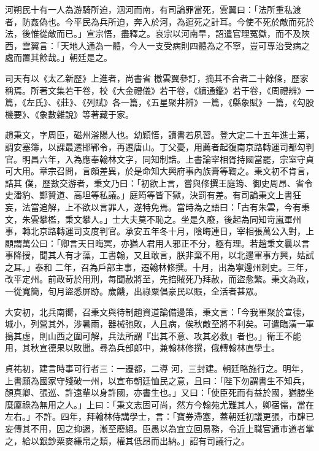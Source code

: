 \begin{pinyinscope}
 河朔民十有一人為游騎所迫，泅河而南，有司論罪當死，雲翼曰：「法所重私渡者，防姦偽也。今平民為兵所迫，奔入於河，為逭死之計耳。今使不死於敵而死於法，後惟從敵而已。」宣宗悟，盡釋之。哀宗以河南旱，詔遣官理冤獄，而不及陜西，雲翼言：「天地人通為一體，今人一支受病則四體為之不寧，豈可專治受病之處而置其餘哉。」朝廷是之。



 司天有以《太乙新歷》上進者，尚書省
 檄雲翼參訂，摘其不合者二十餘條，歷家稱焉。所著文集若干卷，校《大金禮儀》若干卷，《續通鑑》若干卷，《周禮辨》一篇，《左氏》、《莊》、《列賦》各一篇，《五星聚井辨》一篇，《縣象賦》一篇，《勾股機要》、《象數雜說》等著藏于家。



 趙秉文，字周臣，磁州滏陽人也。幼穎悟，讀書若夙習。登大定二十五年進士第，調安塞簿，以課最遷邯鄲令，再遷唐山。丁父憂，用薦者起復南京路轉運司都勾判官。明昌六年，入為應奉翰林文字，同知制誥。上書論宰相胥持國當罷，宗室守貞可大用。章宗召問，言頗差異，於是命知大興府事內族膏等鞫之。秉文初不肯言，詰其
 僕，歷數交游者，秉文乃曰：「初欲上言，嘗與修撰王庭筠、御史周昂、省令史潘豹、鄭贊道、高坦等私議。」庭筠等皆下獄，決罰有差。有司論秉文上書狂妄，法當追解，上不欲以言罪人，遂特免焉。當時為之語曰：「古有朱雲，今有秉文，朱雲攀檻，秉文攀人。」士大夫莫不恥之。坐是久廢，後起為同知岢嵐軍州事，轉北京路轉運司支度判官。承安五年冬十月，陰晦連日，宰相張萬公入對，上顧謂萬公曰：「卿言天日晦冥，亦猶人君用人邪正不分，極有理。若趙秉文曩以言事降授，聞其人有才藻，工書翰，又且敢言，朕非棄不用，以北邊軍事方興，姑試之耳。」泰和
 二年，召為戶部主事，遷翰林修撰。十月，出為寧邊州刺史。三年，改平定州。前政苛於用刑，每聞赦將至，先掊賊死乃拜赦，而盜愈繁。秉文為政，一從寬簡，旬月盜悉屏跡。歲饑，出祿粟倡豪民以賑，全活者甚眾。



 大安初，北兵南嚮，召秉文與待制趙資道論備邊策，秉文言：「今我軍聚於宣德，城小，列營其外，涉暑雨，器械弛敗，人且病，俟秋敵至將不利矣。可遣臨潢一軍搗其虛，則山西之圍可解，兵法所謂『出其不意、攻其必救』者也。」衛王不能用，其秋宣德果以敗聞。尋為兵部郎中，兼翰林修撰，俄轉翰林直學士。



 貞祐初，建言時事可行者三：一遷都，二導
 河，三封建。朝廷略施行之。明年，上書願為國家守殘破一州，以宣布朝廷恤民之意，且曰：「陛下勿謂書生不知兵，顏真卿、張巡、許遠輩以身許國，亦書生也。」又曰：「使臣死而有益於國，猶勝坐糜廩祿為無用之人。」上曰：「秉文志固可尚，然方今翰苑尤難其人，卿宿儒，當在左右。」不許。四年，拜翰林侍講學士，言：「寶券滯塞，蓋朝廷初議更張，市肆已妄傳其不用，因之抑遏，漸至廢絕。臣愚以為宜立回易務，令近上職官通市道者掌之，給以銀鈔粟麥縑帛之類，權其低昂而出納。」詔有司議行之。




\end{pinyinscope}

